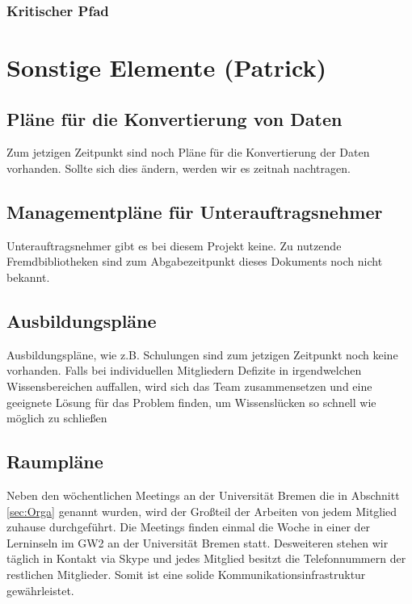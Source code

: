 \documentclass[fontsize=12pt,paper=a4,twoside]{scrartcl}
\begin{document}
\subsubsection{Kritischer Pfad}\label{aps}

\section{Sonstige Elemente (Patrick)}

\subsection{Pläne für die Konvertierung von Daten}
Zum jetzigen Zeitpunkt sind noch Pläne für die Konvertierung der Daten vorhanden. Sollte sich dies ändern, werden wir es zeitnah nachtragen.

\subsection{Managementpläne für Unterauftragsnehmer}
Unterauftragsnehmer gibt es bei diesem Projekt keine. Zu nutzende Fremdbibliotheken sind zum Abgabezeitpunkt dieses Dokuments noch nicht bekannt.

\subsection{Ausbildungspläne}

Ausbildungspläne, wie z.B. Schulungen sind zum jetzigen Zeitpunkt noch keine vorhanden. Falls bei individuellen Mitgliedern Defizite in irgendwelchen Wissensbereichen auffallen, wird sich das Team zusammensetzen und eine geeignete Lösung für das Problem finden, um Wissenslücken so schnell wie möglich zu schließen

\subsection{Raumpläne}

Neben den wöchentlichen Meetings an der Universität Bremen die in Abschnitt \ref{sec:Orga} genannt wurden, wird der Großteil der Arbeiten von jedem Mitglied zuhause durchgeführt. Die Meetings finden einmal die Woche in einer der Lerninseln im GW2 an der Universität Bremen statt. Desweiteren stehen wir täglich in Kontakt via Skype und jedes Mitglied besitzt die Telefonnummern der restlichen Mitglieder. Somit ist eine solide Kommunikationsinfrastruktur gewährleistet.
\end{document}
